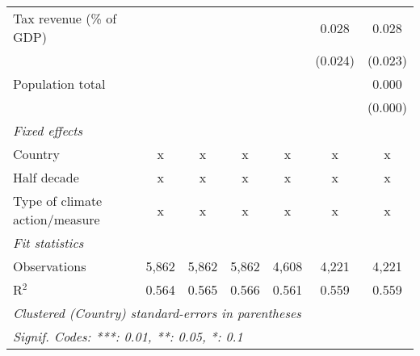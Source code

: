 \begin{tabular}{lcccccc}
   Tax revenue (\% of GDP)                    &         &               &                &                & 0.028          & 0.028\\   
                                              &         &               &                &                & (0.024)        & (0.023)\\   
   Population total                           &         &               &                &                &                & 0.000\\   
                                              &         &               &                &                &                & (0.000)\\   
   \emph{Fixed effects}\\
   Country                                    & x       & x             & x              & x              & x              & x\\  
   Half decade                                & x       & x             & x              & x              & x              & x\\  
   Type of climate action/measure             & x       & x             & x              & x              & x              & x\\  
   \midrule \emph{Fit statistics}\\
   Observations                               & 5,862   & 5,862         & 5,862          & 4,608          & 4,221          & 4,221\\  
   R$^2$                                      & 0.564   & 0.565         & 0.566          & 0.561          & 0.559          & 0.559\\  
   \midrule
   \multicolumn{7}{l}{\emph{Clustered (Country) standard-errors in parentheses}}\\
   \multicolumn{7}{l}{\emph{Signif. Codes: ***: 0.01, **: 0.05, *: 0.1}}\\
\end{tabular}
\par\endgroup


